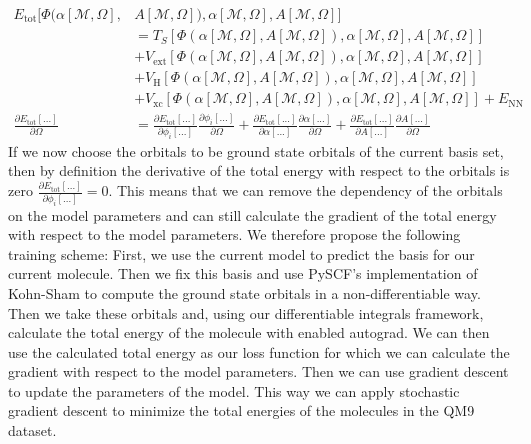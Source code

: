 \begin{align}
    E_{\text{tot}}[\Phi(\alpha[\mathcal{M},\Omega],&A[\mathcal{M},\Omega]),\alpha[\mathcal{M},\Omega],A[\mathcal{M},\Omega]] \\
    &= T_S[\Phi(\alpha[\mathcal{M},\Omega],A[\mathcal{M},\Omega]),\alpha[\mathcal{M},\Omega],A[\mathcal{M},\Omega]] \nonumber\\
    &+ V_{\text{ext}}[\Phi(\alpha[\mathcal{M},\Omega],A[\mathcal{M},\Omega]),\alpha[\mathcal{M},\Omega],A[\mathcal{M},\Omega]] \nonumber\\
    &+ V_{\text{H}}[\Phi(\alpha[\mathcal{M},\Omega],A[\mathcal{M},\Omega]),\alpha[\mathcal{M},\Omega],A[\mathcal{M},\Omega]] \nonumber\\
    &+ V_{\text{xc}}[\Phi(\alpha[\mathcal{M},\Omega],A[\mathcal{M},\Omega]),\alpha[\mathcal{M},\Omega],A[\mathcal{M},\Omega]] + E_{\text{NN}}\nonumber\\
        \frac{\partial E_{\text{tot}}[...]}{\partial \Omega}
    &= \frac{\partial E_{\text{tot}}[...]}{\partial \phi_i[...]}\frac{\partial \phi_i[...]}{\partial \Omega} + \frac{\partial E_{\text{tot}}[...]}{\partial \alpha[...]}\frac{\partial \alpha[...]}{\partial \Omega} + \frac{\partial E_{\text{tot}}[...]}{\partial A[...]}\frac{\partial A[...]}{\partial \Omega}
\end{align}
If we now choose the orbitals to be ground state orbitals of the current basis set, then by definition the derivative of the total energy with respect to the orbitals is zero $\frac{\partial E_{\text{tot}}[...]}{\partial \phi_i[...]}=0$. This means that we can remove the dependency of the orbitals on the model parameters and can still calculate the gradient of the total energy with respect to the model parameters. We therefore propose the following training scheme: First, we use the current model to predict the basis for our current molecule. Then we fix this basis and use PySCF's\cite{pyscf} implementation of Kohn-Sham to compute the ground state orbitals in a non-differentiable way. Then we take these orbitals and, using our differentiable integrals framework, calculate the total energy of the molecule with enabled autograd. We can then use the calculated total energy as our loss function for which we can calculate the gradient with respect to the model parameters. Then we can use gradient descent to update the parameters of the model. This way we can apply stochastic gradient descent to minimize the total energies of the molecules in the QM9 dataset.\\


